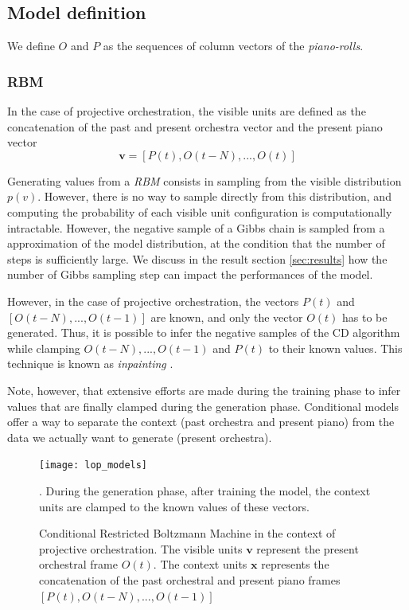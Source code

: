 \documentclass{article}
\begin{document}
\subsection{Model definition}
We define $O$ and $P$ as the sequences of column vectors of the \textit{piano-rolls}.
\subsubsection{RBM}
In the case of projective orchestration, the visible units are defined as the concatenation of the past and present orchestra vector and the present piano vector
\begin{equation}
\label{eq:visible_rbm}
\bm{v} = \left[P(t),O(t-N),...,O(t)\right]
\end{equation}

Generating values from a \textit{RBM} consists in sampling from the visible distribution $p(v)$. However, there is no way to sample directly from this distribution, and computing the probability of each visible unit configuration is computationally intractable.
However, the negative sample of a Gibbs chain is sampled from a approximation of the model distribution, at the condition that the number of steps is sufficiently large. We discuss in the result section \ref{sec:results} how the number of Gibbs sampling step can impact the performances of the model.

However, in the case of projective orchestration, the vectors $P(t)$ and $[O(t-N), ..., O(t-1)]$ are known, and only the vector $O(t)$ has to be generated. 
Thus, it is possible to infer the negative samples of the CD algorithm while clamping $O(t-N), ..., O(t-1)$ and $P(t)$ to their known values. This technique is known as \textit{inpainting} \cite{Fischer2012}.

Note, however, that extensive efforts are made during the training phase to infer values that are finally clamped during the generation phase. Conditional models offer a way to separate the context (past orchestra and present piano) from the data we actually want to generate (present orchestra).

 \begin{figure}
 	\begin{centering}
 		\texttt{[image: lop\_models]}
 		\par\end{centering}
 	\caption{Conditional Restricted Boltzmann Machine in the context of projective orchestration. The visible units $\bm{v}$ represent the present orchestral frame $O(t)$. The context units $\bm{x}$ represents the concatenation of the past orchestral and present piano frames $[P(t), O(t-N), ..., O(t-1)]$}.
During the generation phase, after training the model, the context units are clamped to the known values of these vectors.
 	\label{fig:lop_models}
 \end{figure}
\end{document}
